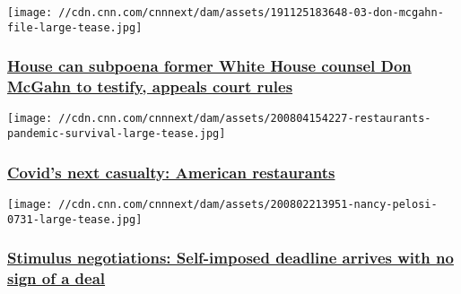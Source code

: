 \href{/2020/08/07/politics/don-mcgahn-subpoena/index.html}{}

\texttt{[image: //cdn.cnn.com/cnnnext/dam/assets/191125183648-03-don-mcgahn-file-large-tease.jpg]}

\hypertarget{house-can-subpoena-former-white-house-counsel-don-mcgahn-to-testify-appeals-court-rules}{%
\subsubsection{\texorpdfstring{\href{/2020/08/07/politics/don-mcgahn-subpoena/index.html}{House
can subpoena former White House counsel Don McGahn to testify, appeals
court
rules}}{House can subpoena former White House counsel Don McGahn to testify, appeals court rules}}\label{house-can-subpoena-former-white-house-counsel-don-mcgahn-to-testify-appeals-court-rules}}

\href{/2020/08/07/opinions/covid-19-restaurants-help-from-congress-avlon/index.html}{}

\texttt{[image: //cdn.cnn.com/cnnnext/dam/assets/200804154227-restaurants-pandemic-survival-large-tease.jpg]}

\hypertarget{covids-next-casualty-american-restaurants}{%
\subsubsection{\texorpdfstring{\href{/2020/08/07/opinions/covid-19-restaurants-help-from-congress-avlon/index.html}{Covid's
next casualty: American
restaurants}}{Covid's next casualty: American restaurants}}\label{covids-next-casualty-american-restaurants}}

\href{/2020/08/07/politics/congress-stimulus-negotiations-state-of-play/index.html}{}

\texttt{[image: //cdn.cnn.com/cnnnext/dam/assets/200802213951-nancy-pelosi-0731-large-tease.jpg]}

\hypertarget{stimulus-negotiations-self-imposed-deadline-arrives-with-no-sign-of-a-deal}{%
\subsubsection{\texorpdfstring{\href{/2020/08/07/politics/congress-stimulus-negotiations-state-of-play/index.html}{Stimulus
negotiations: Self-imposed deadline arrives with no sign of a
deal}}{Stimulus negotiations: Self-imposed deadline arrives with no sign of a deal}}\label{stimulus-negotiations-self-imposed-deadline-arrives-with-no-sign-of-a-deal}}

